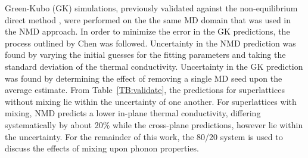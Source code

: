 \documentclass[aps,prb,preprint,preprintnumbers,amsmath,amssymb,floatfix,superscriptaddress]{revtex4}
\begin{document}
Green-Kubo (GK) simulations, previously validated against the non-equilibrium direct method \cite {PhysRevB.79.075316}, were performed on the the same MD domain that was used in the NMD approach. In order to minimize the error in the GK predictions, the process outlined by Chen \cite{Chen20102392} was followed.  Uncertainty in the NMD prediction was found by varying the initial guesses for the fitting parameters and taking the standard deviation of the thermal conductivity. Uncertainty in the GK prediction was found by determining the effect of removing a single MD seed upon the average estimate. From Table~\ref{TB:validate}, the predictions for superlattices without mixing lie within the uncertainty of one another. For superlattices with mixing, NMD predicts a lower in-plane thermal conductivity, differing systematically by about 20\% while the cross-plane predictions, however lie within the uncertainty. For the remainder of this work, the 80/20 system is used to discuss the effects of mixing upon phonon properties.
\end{document}

